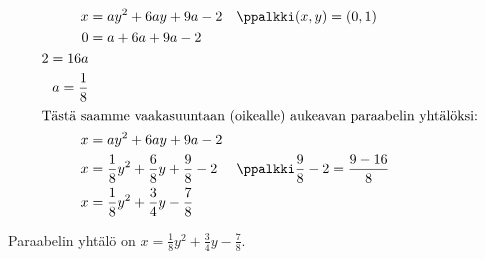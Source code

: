 \begin{esimerkki}
\begin{esimratk}
        \begin{align*}
        x &= ay^2 +6ay +9a -2 && \ppalkki (x,y) = (0,1) \\
        0 &= a +6a +9a -2 \\
        2 = 16a \\
        a = \frac{1}{8}\\
        \intertext{Tästä saamme vaakasuuntaan (oikealle) aukeavan paraabelin yhtälöksi:}
        x &= ay^2 +6ay +9a -2 \\
        x &= \frac{1}{8}y^2 + \frac{6}{8}y + \frac{9}{8} -2  && \ppalkki \frac{9}{8} -2 = \frac{9 - 16}{8}\\
        x &= \frac{1}{8}y^2 + \frac{3}{4}y - \frac{7}{8}
        \end{align*}
    \end{esimratk}
    \begin{esimvast} %
        Paraabelin yhtälö on $x = \frac{1}{8}y^2 + \frac{3}{4}y - \frac{7}{8}$.
    \end{esimvast}
\end{esimerkki}




